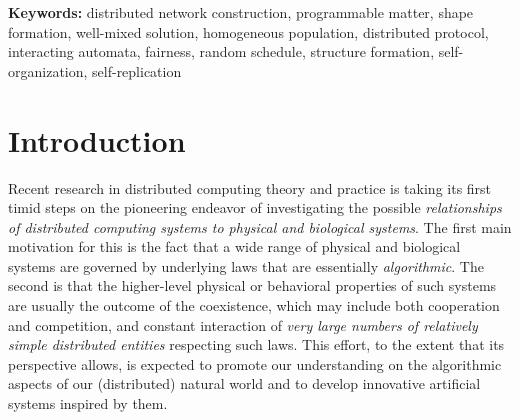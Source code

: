 \documentclass[oribibl, 11pt]{llncs}
\begin{document}
\noindent
\textbf{Keywords:} distributed network construction, programmable matter, shape formation, well-mixed solution, homogeneous population, distributed protocol, interacting automata, fairness, random schedule, structure formation, self-organization, self-replication

\section{Introduction}
\label{sec:intro}

Recent research in distributed computing theory and practice is taking its first timid steps on the pioneering endeavor of investigating the possible \emph{relationships of distributed computing systems to physical and biological systems}. The first main motivation for this is the fact that a wide range of physical and biological systems are governed by underlying laws that are essentially \emph{algorithmic}. The second is that the higher-level physical or behavioral properties of such systems are usually the outcome of the coexistence, which may include both cooperation and competition, and constant interaction of \emph{very large numbers of relatively simple distributed entities} respecting such laws. This effort, to the extent that its perspective allows, is expected to promote our understanding on the algorithmic aspects of our (distributed) natural world and to develop innovative artificial systems inspired by them.
\end{document}
